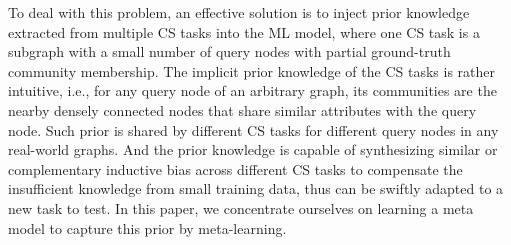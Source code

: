 \documentclass[conference]{IEEEtran}
\begin{document}
To deal with this problem, an effective solution is to inject prior
knowledge extracted from multiple CS tasks into the ML model,
%
%
where one CS task is a subgraph with a small number of
query nodes with partial ground-truth community membership.
The implicit prior knowledge of the CS tasks is rather intuitive,
i.e., for any query node of an arbitrary graph, its communities are
the nearby densely connected nodes that share similar attributes with
the query node. Such prior is shared by different CS tasks for
different query nodes in any real-world graphs.
%
%
%
%
%
%
%
And the prior knowledge is capable of synthesizing similar or
complementary inductive bias across different CS tasks to compensate
the insufficient knowledge from small training data, thus can be
swiftly adapted to a new task to test.
%
In this paper, we concentrate ourselves on learning a meta model to
capture this prior by meta-learning.
\end{document}
